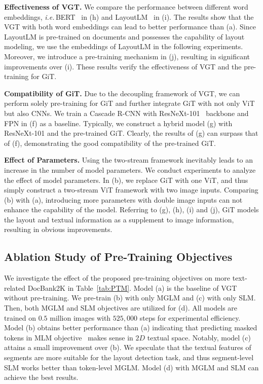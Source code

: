 \documentclass[10pt,twocolumn,letterpaper]{article}
\def\ie{\emph{i.e.}\,}
\begin{document}
\noindent
\textbf{Effectiveness of VGT.} 
We compare the performance between different word embeddings, 
\ie BERT~\cite{devlin2018bert} in (h) and LayoutLM~\cite{xu2020layoutlm} in (i).
The results show that the VGT with both word embeddings can lead to better performance than (a).
Since LayoutLM is pre-trained on documents and possesses the capability of layout modeling,
we use the embeddings of LayoutLM in the following experiments.
Moreover, we introduce a pre-training mechanism in (j), resulting in significant improvements over (i).
These results verify the effectiveness of VGT and the pre-training for GiT.


\noindent
\textbf{Compatibility of GiT.} 
Due to the decoupling framework of VGT,
we can perform solely pre-training for GiT and further integrate GiT with not only ViT but also CNNs.
We train a Cascade R-CNN with ResNeXt-101~\cite{resnext} backbone and FPN in (f) as a baseline.
Typically, we construct a hybrid model (g) with ResNeXt-101 and the pre-trained GiT.
Clearly, the results of (g) can surpass that of (f), 
demonstrating the good compatibility of the pre-trained GiT.


\noindent
\textbf{Effect of Parameters.} 
Using the two-stream framework inevitably leads to an increase in the number of model parameters.
We conduct experiments to analyze the effect of model parameters.
In (b), we replace GiT with one ViT,  and thus simply construct a two-stream ViT framework with two image inputs.
Comparing (b) with (a), introducing more parameters with double image inputs can not enhance the capability of the model.
Referring to (g), (h), (i) and (j), GiT models the layout and textual information as a supplement to image information,
resulting in obvious improvements.

\subsection{Ablation Study of Pre-Training Objectives}
We investigate the effect of the proposed pre-training objectives on more text-related DocBank2K in Table~\ref{tab:PTM}.
Model (a) is the baseline of VGT without pre-training.
We pre-train (b) with only MGLM  and (c) with only SLM.
Then, both MGLM and SLM objectives are utilized for (d).
All models are trained on $0.5$ million images with $525,000$ steps for experimental efficiency.
Model (b) obtains better performance than (a)
indicating that predicting masked tokens in MLM objective~\cite{devlin2018bert} makes sense in $2D$ textual space.
Notably, model (c) attains a small improvement over (b).
We speculate that the textual features of segments are more suitable for the layout detection task, 
and thus segment-level SLM works better than token-level MGLM.
Model (d) with MGLM and SLM can achieve the best results.
\end{document}
